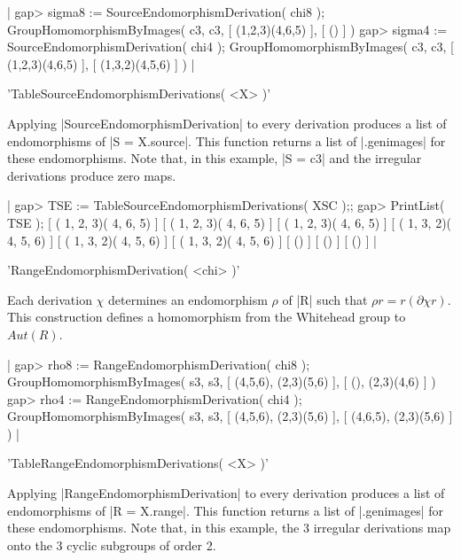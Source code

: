 {|    gap> sigma8 := SourceEndomorphismDerivation( chi8 );
    GroupHomomorphismByImages( c3, c3, [ (1,2,3)(4,6,5) ], [ () ] )
    gap> sigma4 := SourceEndomorphismDerivation( chi4 );
    GroupHomomorphismByImages( c3, c3, [ (1,2,3)(4,6,5) ], 
       [ (1,3,2)(4,5,6) ] ) |

%

'TableSourceEndomorphismDerivations( <X> )'

Applying |SourceEndomorphismDerivation| to every derivation
produces a list of endomorphisms of |S = X.source|.
This function returns a list of  |.genimages|  for these endomorphisms.
Note that, in this example, |S = c3| and
the irregular derivations produce zero maps.

|    gap> TSE := TableSourceEndomorphismDerivations( XSC );;
    gap> PrintList( TSE );
    [ ( 1, 2, 3)( 4, 6, 5) ]
    [ ( 1, 2, 3)( 4, 6, 5) ]
    [ ( 1, 2, 3)( 4, 6, 5) ]
    [ ( 1, 3, 2)( 4, 5, 6) ]
    [ ( 1, 3, 2)( 4, 5, 6) ]
    [ ( 1, 3, 2)( 4, 5, 6) ]
    [ () ]
    [ () ]
    [ () ]  |

%

'RangeEndomorphismDerivation( <chi> )'

Each derivation $\chi$ determines an endomorphism  $\rho$
of |R| such that  $\rho r = r (\partial \chi r)$.
This construction defines a homomorphism from the
Whitehead group to $Aut(R)$.

|    gap> rho8 := RangeEndomorphismDerivation( chi8 );
    GroupHomomorphismByImages( s3, s3, [ (4,5,6), (2,3)(5,6) ], 
      [ (), (2,3)(4,6) ] )
    gap> rho4 := RangeEndomorphismDerivation( chi4 );
    GroupHomomorphismByImages( s3, s3, [ (4,5,6), (2,3)(5,6) ], 
      [ (4,6,5), (2,3)(5,6) ] )   |

%

'TableRangeEndomorphismDerivations( <X> )'

Applying |RangeEndomorphismDerivation| to every derivation
produces a list of endomorphisms of |R = X.range|.
This function returns a list of  |.genimages|  for these endomorphisms.
Note that, in this example,
the 3 irregular derivations map onto the 3 cyclic subgroups of order 2.

}
